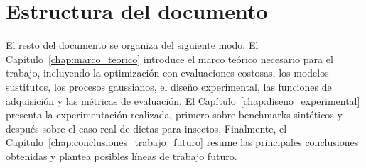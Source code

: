 \section{Estructura del documento}
\label{sec:estructura_documento}

El resto del documento se organiza del siguiente modo. El Capítulo~\ref{chap:marco_teorico} introduce el marco teórico necesario para el trabajo, incluyendo la optimización con evaluaciones costosas, los modelos sustitutos, los procesos gaussianos, el diseño experimental, las funciones de adquisición y las métricas de evaluación. El Capítulo~\ref{chap:diseno_experimental} presenta la experimentación realizada, primero sobre benchmarks sintéticos y después sobre el caso real de dietas para insectos. Finalmente, el Capítulo~\ref{chap:conclusiones_trabajo_futuro} resume las principales conclusiones obtenidas y plantea posibles líneas de trabajo futuro.

